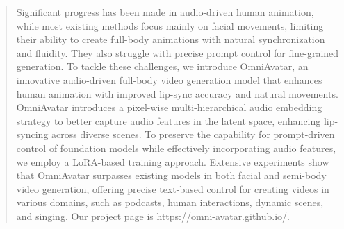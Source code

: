 \begin{abstract}
Significant progress has been made in audio-driven human animation, while most existing methods focus mainly on facial movements, limiting their ability to create full-body animations with natural synchronization and fluidity. They also struggle with precise prompt control for fine-grained generation. To tackle these challenges, we introduce OmniAvatar, an innovative audio-driven full-body video generation model that enhances human animation with improved lip-sync accuracy and natural movements. OmniAvatar introduces a pixel-wise multi-hierarchical audio embedding strategy to better capture audio features in the latent space, enhancing lip-syncing across diverse scenes. To preserve the capability for prompt-driven control of foundation models while effectively incorporating audio features, we employ a LoRA-based training approach. Extensive experiments show that OmniAvatar surpasses existing models in both facial and semi-body video generation, offering precise text-based control for creating videos in various domains, such as podcasts, human interactions, dynamic scenes, and singing. Our project page is https://omni-avatar.github.io/.
\end{abstract}